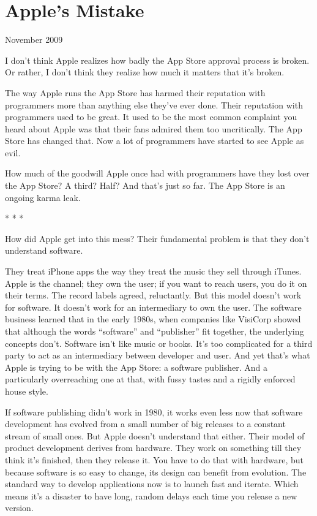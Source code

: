 \chapter{Apple's Mistake}

November 2009

I don't think Apple realizes how badly the App Store approval process is
broken. Or rather, I don't think they realize how much it matters that
it's broken.

The way Apple runs the App Store has harmed their reputation with
programmers more than anything else they've ever done. Their reputation
with programmers used to be great. It used to be the most common
complaint you heard about Apple was that their fans admired them too
uncritically. The App Store has changed that. Now a lot of programmers
have started to see Apple as evil.

How much of the goodwill Apple once had with programmers have they lost
over the App Store? A third? Half? And that's just so far. The App Store
is an ongoing karma leak.

* * *

How did Apple get into this mess? Their fundamental problem is that they
don't understand software.

They treat iPhone apps the way they treat the music they sell through
iTunes. Apple is the channel; they own the user; if you want to reach
users, you do it on their terms. The record labels agreed, reluctantly.
But this model doesn't work for software. It doesn't work for an
intermediary to own the user. The software business learned that in the
early 1980s, when companies like VisiCorp showed that although the words
``software'' and ``publisher'' fit together, the underlying concepts
don't. Software isn't like music or books. It's too complicated for a
third party to act as an intermediary between developer and user. And
yet that's what Apple is trying to be with the App Store: a software
publisher. And a particularly overreaching one at that, with fussy
tastes and a rigidly enforced house style.

If software publishing didn't work in 1980, it works even less now that
software development has evolved from a small number of big releases to
a constant stream of small ones. But Apple doesn't understand that
either. Their model of product development derives from hardware. They
work on something till they think it's finished, then they release it.
You have to do that with hardware, but because software is so easy to
change, its design can benefit from evolution. The standard way to
develop applications now is to launch fast and iterate. Which means it's
a disaster to have long, random delays each time you release a new
version.

